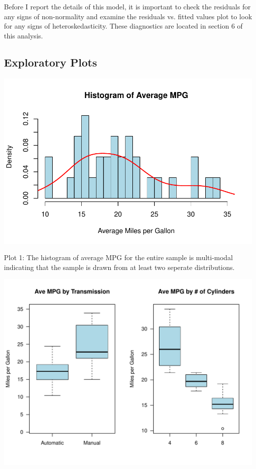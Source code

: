 \documentclass{article}
\begin{document}
{Before I report the details of this model, it is important to check the residuals for any signs of non-normality and examine the residuals vs. fitted values plot to look for any signs of heteroskedasticity. These diagnostics are located in section 6 of this analysis.


\subsection{Exploratory Plots}

\includegraphics{project-RM-014}

\begin{center}
Plot 1: The histogram of average MPG for the entire sample is multi-modal indicating that the sample is drawn from at least two seperate distributions.
\end{center}

\includegraphics{project-RM-015}

}
\end{document}
